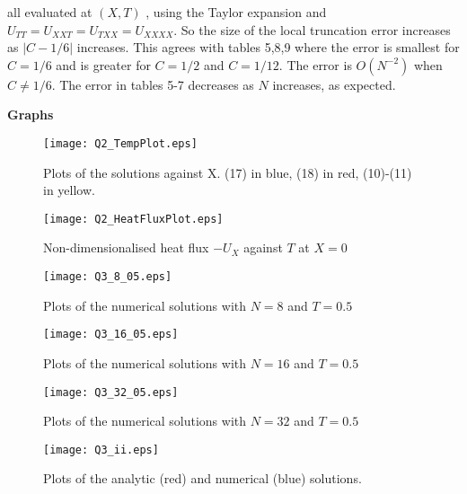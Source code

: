 \documentclass[12pt]{extarticle}
\begin{document}
all evaluated at $(X,T)$ , using the Taylor expansion and $U_{TT} = U_{XXT} = U_{TXX} = U_{XXXX}$. So the size of the local truncation error increases as $|C-1/6|$ increases. This agrees with tables 5,8,9 where the error is smallest for $C=1/6$ and is greater for $C=1/2$ and $C=1/12$. The error is $O(N^{-2})$ when $C \neq 1/6$. The error in tables 5-7 decreases as $N$ increases, as expected. 
\pagebreak

\textbf{Graphs}

\begin{figure}[htp!]
\centering
\texttt{[image: Q2\_TempPlot.eps]}\\
\caption{Plots of the solutions against X. (17) in blue, (18) in red, (10)-(11) in yellow.}
\label{figure:1}
\end{figure} 

\begin{figure}[htp!]
\centering
\texttt{[image: Q2\_HeatFluxPlot.eps]}\\
\caption{Non-dimensionalised heat flux $-U_X$ against $T$ at $X=0$}
\label{figure:2}
\end{figure} 

\begin{figure}[htp!]
\centering
\texttt{[image: Q3\_8\_05.eps]}\\
\caption{Plots of the numerical solutions with $N=8$ and $T=0.5$}
\label{figure:3}
\end{figure} 

\begin{figure}[htp!]
\centering
\texttt{[image: Q3\_16\_05.eps]}\\
\caption{Plots of the numerical solutions with $N=16$ and $T=0.5$}
\label{figure:4}
\end{figure} 

\begin{figure}[htp!]
\centering
\texttt{[image: Q3\_32\_05.eps]}\\
\caption{Plots of the numerical solutions with $N=32$ and $T=0.5$}
\label{figure:5}
\end{figure} 

\begin{figure}[htp!]
\centering
\texttt{[image: Q3\_ii.eps]}\\
\caption{Plots of the analytic (red) and numerical (blue) solutions. }
\label{figure:6}
\end{figure} 
\end{document}
